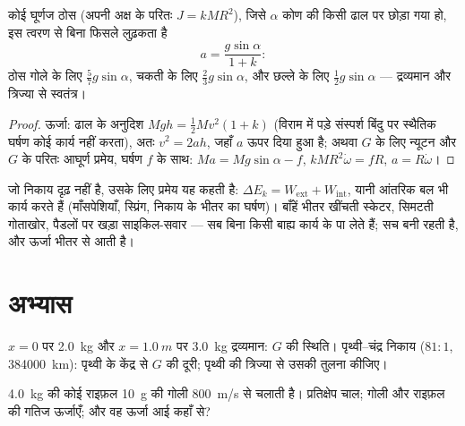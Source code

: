 \begin{proposition}[ढाल पर बिना फिसले लुढ़कना]\label{prop:b1:systems-of-points:rollingincline}
कोई घूर्णज ठोस (अपनी अक्ष के परितः $J = kMR^2$), जिसे $\alpha$ कोण की किसी
ढाल पर छोड़ा गया हो, इस त्वरण से बिना फिसले लुढ़कता है
\[
a = \frac{g\sin\alpha}{1 + k} :
\]
ठोस गोले के लिए $\tfrac57 g\sin\alpha$, चकती के लिए $\tfrac23 g\sin\alpha$,
और छल्ले के लिए $\tfrac12 g\sin\alpha$ --- द्रव्यमान और त्रिज्या से स्वतंत्र।
\end{proposition}

\begin{proof}
ऊर्जा: ढाल के अनुदिश $Mgh = \tfrac12 Mv^2(1 + k)$ (विराम में पड़े संस्पर्श
बिंदु पर स्थैतिक घर्षण कोई कार्य नहीं करता), अतः $v^2 = 2ah$, जहाँ $a$ ऊपर
दिया हुआ है; अथवा $G$ के लिए न्यूटन और $G$ के परितः आघूर्ण प्रमेय, घर्षण
$f$ के साथ: $Ma = Mg\sin\alpha - f$, $kMR^2\dot\omega = fR$, $a = R\dot\omega$।
\end{proof}

\begin{remark}[विरूप्य निकाय]\label{rem:b1:systems-of-points:deformable}
जो निकाय दृढ़ नहीं है, उसके लिए  प्रमेय यह कहती है:
$\Delta E_k = W_{\mathrm{ext}} + W_{\mathrm{int}}$, यानी आंतरिक बल भी कार्य
करते हैं (माँसपेशियाँ, स्प्रिंग, निकाय के भीतर का घर्षण)। बाँहें भीतर
खींचती स्केटर, सिमटती गोताखोर, पैडलों पर खड़ा साइकिल-सवार --- सब बिना किसी
बाह्य कार्य के  पा लेते हैं;  सच बनी
रहती है, और ऊर्जा भीतर से आती है।
\end{remark}

\section{अभ्यास}

\begin{exercise}[$\star$]\label{exo:b1:systems-of-points:1}
$x = 0$ पर \qty{2.0}{kg} और $x = \qty{1.0}{m}$ पर \qty{3.0}{kg} द्रव्यमान:
$G$ की स्थिति। पृथ्वी--चंद्र निकाय ($81:1$, \qty{384000}{km}): पृथ्वी के
केंद्र से $G$ की दूरी; पृथ्वी की त्रिज्या से उसकी तुलना
कीजिए।
\end{exercise}

\begin{exercise}[$\star$]\label{exo:b1:systems-of-points:2}
\qty{4.0}{kg} की कोई राइफ़ल \qty{10}{g} की गोली \qty{800}{m/s} से चलाती
है। प्रतिक्षेप चाल; गोली और राइफ़ल की गतिज ऊर्जाएँ; और वह ऊर्जा आई कहाँ
से?
\end{exercise}

